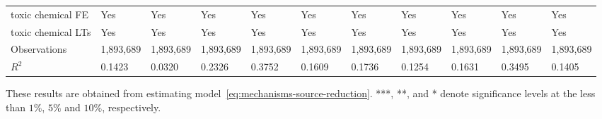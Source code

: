 \begin{table}[H]
{\begin{tabular}{@{}lllllllllll@{}}
            toxic chemical FE  & Yes           & Yes           & Yes            & Yes          & Yes            & Yes       & Yes                          & Yes              & Yes                   & Yes              \\
            toxic chemical LTs & Yes           & Yes           & Yes            & Yes          & Yes            & Yes       & Yes                          & Yes              & Yes                   & Yes              \\\midrule\midrule
            Observations       & 1,893,689     & 1,893,689     & 1,893,689      & 1,893,689    & 1,893,689      & 1,893,689 & 1,893,689                    & 1,893,689        & 1,893,689             & 1,893,689        \\
            $R^2$              & 0.1423        & 0.0320        & 0.2326         & 0.3752       & 0.1609         & 0.1736    & 0.1254                       & 0.1631           & 0.3495                & 0.1405           \\ \bottomrule \bottomrule
        \end{tabular}%
    }
    \begin{minipage}{18cm}
        \vspace{0.05in}
        These results are obtained from estimating model~\ref{eq:mechanisms-source-reduction}. ***, **, and * denote significance levels at the less than $1\%$, $5\%$ and $10\%$, respectively.
    \end{minipage}
\end{table}